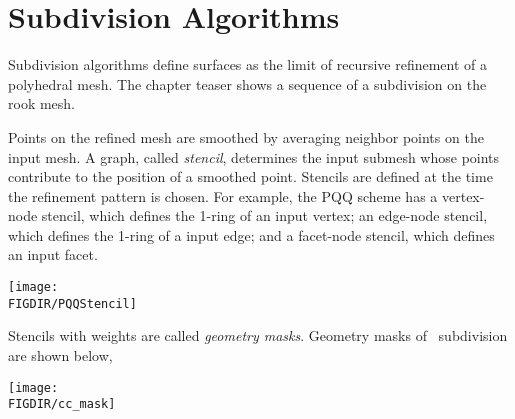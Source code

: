  



\section{Subdivision Algorithms}
Subdivision algorithms define surfaces as the limit
of recursive refinement of a polyhedral mesh. The chapter teaser
shows a sequence of a subdivision on the rook mesh.

Points on the refined mesh are smoothed by averaging
neighbor points on the input mesh. A graph, called \emph{stencil}, 
determines the input submesh whose points contribute to the 
position of a smoothed point. Stencils are defined at the time 
the refinement pattern is chosen. For example, 
the PQQ scheme has a vertex-node stencil, which defines 
the 1-ring of an input vertex; an edge-node stencil, which 
defines the 1-ring of a input edge; and a facet-node stencil,
which defines an input facet.

\begin{ccTexOnly}
  \begin{center}
    \parbox{0.5\textwidth}{%
      \texttt{[image: \\FIGDIR/PQQStencil]}%
    }
  \end{center}
\end{ccTexOnly}

Stencils with weights are called \emph{geometry masks}.
Geometry masks of \CC\ subdivision are shown below,

\begin{ccTexOnly}
  \begin{center}
    \parbox{0.4\textwidth}{%
      \texttt{[image: \\FIGDIR/cc\_mask]}%
    }
  \end{center}
\end{ccTexOnly}

